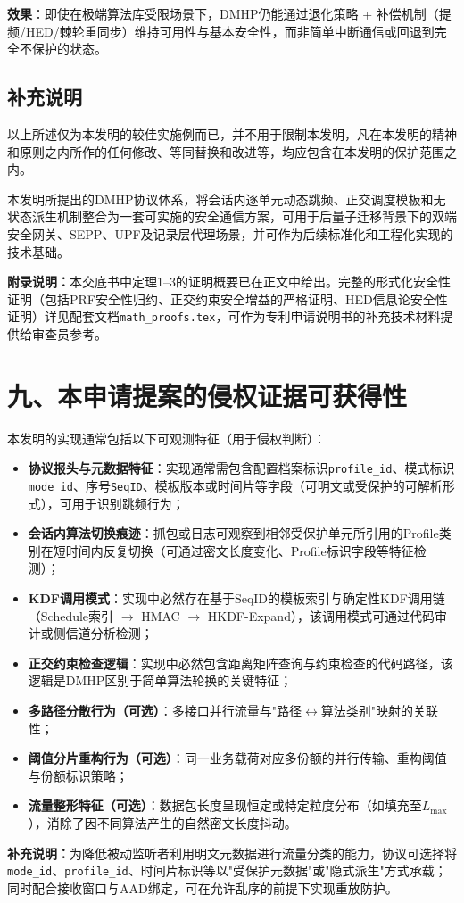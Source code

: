 ﻿\documentclass[12pt,a4paper]{article}
\begin{document}
\textbf{效果}：即使在极端算法库受限场景下，DMHP仍能通过退化策略 + 补偿机制（提频/HED/棘轮重同步）维持可用性与基本安全性，而非简单中断通信或回退到完全不保护的状态。

\subsection*{补充说明}

以上所述仅为本发明的较佳实施例而已，并不用于限制本发明，凡在本发明的精神和原则之内所作的任何修改、等同替换和改进等，均应包含在本发明的保护范围之内。

本发明所提出的DMHP协议体系，将会话内逐单元动态跳频、正交调度模板和无状态派生机制整合为一套可实施的安全通信方案，可用于后量子迁移背景下的双端安全网关、SEPP、UPF及记录层代理场景，并可作为后续标准化和工程化实现的技术基础。

\textbf{附录说明：}本交底书中定理1--3的证明概要已在正文中给出。完整的形式化安全性证明（包括PRF安全性归约、正交约束安全增益的严格证明、HED信息论安全性证明）详见配套文档\texttt{math\_proofs.tex}，可作为专利申请说明书的补充技术材料提供给审查员参考。

\section*{九、本申请提案的侵权证据可获得性}
本发明的实现通常包括以下可观测特征（用于侵权判断）：

\begin{itemize}
    \item \textbf{协议报头与元数据特征}：实现通常需包含配置档案标识\texttt{profile\_id}、模式标识\texttt{mode\_id}、序号\texttt{SeqID}、模板版本或时间片等字段（可明文或受保护的可解析形式），可用于识别跳频行为；
    \item \textbf{会话内算法切换痕迹}：抓包或日志可观察到相邻受保护单元所引用的Profile类别在短时间内反复切换（可通过密文长度变化、Profile标识字段等特征检测）；
    \item \textbf{KDF调用模式}：实现中必然存在基于SeqID的模板索引与确定性KDF调用链（Schedule索引 $\to$ HMAC $\to$ HKDF-Expand），该调用模式可通过代码审计或侧信道分析检测；
    \item \textbf{正交约束检查逻辑}：实现中必然包含距离矩阵查询与约束检查的代码路径，该逻辑是DMHP区别于简单算法轮换的关键特征；
    \item \textbf{多路径分散行为（可选）}：多接口并行流量与"路径$\leftrightarrow$算法类别"映射的关联性；
    \item \textbf{阈值分片重构行为（可选）}：同一业务载荷对应多份额的并行传输、重构阈值与份额标识策略；
    \item \textbf{流量整形特征（可选）}：数据包长度呈现恒定或特定粒度分布（如填充至$L_{\max}$），消除了因不同算法产生的自然密文长度抖动。
\end{itemize}

\noindent\textbf{补充说明：}为降低被动监听者利用明文元数据进行流量分类的能力，协议可选择将\texttt{mode\_id}、\texttt{profile\_id}、时间片标识等以"受保护元数据"或"隐式派生"方式承载；同时配合接收窗口与AAD绑定，可在允许乱序的前提下实现重放防护。
\end{document}
